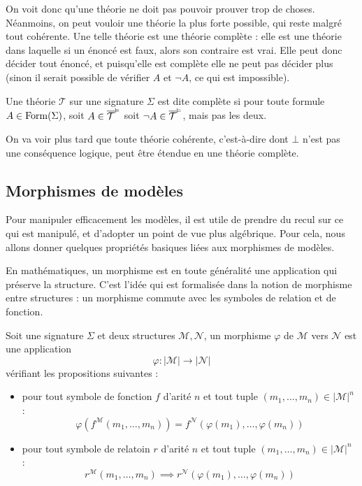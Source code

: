On voit donc qu'une théorie ne doit pas pouvoir prouver trop de choses.
Néanmoins, on peut vouloir une théorie la plus forte possible, qui reste malgré
tout cohérente. Une telle théorie est une théorie complète : elle est une
théorie dans laquelle si un énoncé est faux, alors son contraire est vrai. Elle
peut donc décider tout énoncé, et puisqu'elle est complète elle ne peut pas
décider plus (sinon il serait possible de vérifier $A$ et $\lnot A$, ce qui est
impossible).

\begin{definition}
  Une théorie $\mathcal T$ sur une signature $\Sigma$ est dite complète si pour
  toute formule $A\in\operatorname{Form}(\Sigma)$, soit $A\in \overline{\mathcal T}^{\vDash}$ soit
  $\lnot A \in \overline{\mathcal T}^{\vDash}$, mais pas les deux.
\end{definition}

On va voir plus tard que toute théorie cohérente, c'est-à-dire dont $\bot$ n'est
pas une conséquence logique, peut être étendue en une théorie complète.

\subsection{Morphismes de modèles}

Pour manipuler efficacement les modèles, il est utile de prendre du recul sur ce
qui est manipulé, et d'adopter un point de vue plus algébrique. Pour cela, nous
allons donner quelques propriétés basiques liées aux morphismes de modèles.

En mathématiques, un morphisme est en toute généralité une application qui
préserve la structure. C'est l'idée qui est formalisée dans la notion de
morphisme entre structures : un morphisme commute avec les symboles de relation
et de fonction.

\begin{definition}
  Soit une signature $\Sigma$ et deux structures $\mathcal M,\mathcal N$, un
  morphisme $\varphi$ de $\mathcal M$ vers $\mathcal N$ est une application
  \[\varphi : |\mathcal M|\longrightarrow |\mathcal N|\]
  vérifiant les propositions suivantes :
  \begin{itemize}
  \item pour tout symbole de fonction $f$ d'arité $n$ et tout tuple
    $(m_1,\ldots,m_n)\in|\mathcal M|^n$ :
    \[\varphi(f^{\mathcal M}(m_1,\ldots,m_n))
    = f^{\mathcal N}(\varphi(m_1),\ldots,\varphi(m_n))\]
  \item pour tout symbole de relatoin $r$ d'arité $n$ et tout tuple
    $(m_1,\ldots,m_n)\in|\mathcal M|^n$ :
    \[r^{\mathcal M}(m_1,\ldots,m_n) \implies
    r^{\mathcal N}(\varphi(m_1),\ldots,\varphi(m_n)) \]
  \end{itemize}
\end{definition}

